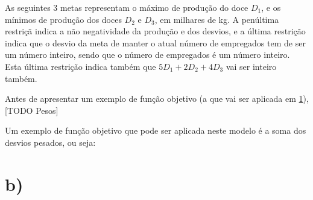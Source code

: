 As seguintes 3 metas representam o máximo de produção do doce $D_1$, e os mínimos de produção dos doces $D_2$ e $D_3$, em milhares de \unit{\kilogram}. A penúltima restriçã indica a não negatividade da produção e dos desvios, e a última restrição indica que o desvio da meta de manter o atual número de empregados tem de ser um número inteiro, sendo que o número de empregados é um número inteiro. Esta última restrição indica também que $5D_1 + 2D_2 + 4D_3$ vai ser inteiro também. 

Antes de apresentar um exemplo de função objetivo (a que vai ser aplicada em \ref{sec:b}), [TODO Pesos]

Um exemplo de função objetivo que pode ser aplicada neste modelo é a soma dos desvios pesados, ou seja:

\section{b)} \label{sec:b}